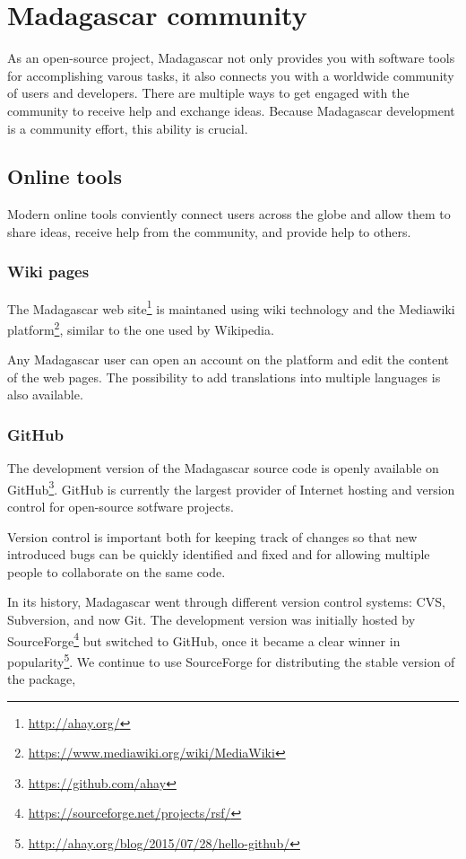\chapter{Madagascar community}

As an open-source project, Madagascar not only provides you with
software tools for accomplishing varous tasks, it also connects you
with a worldwide community of users and developers. There are multiple
ways to get engaged with the community to receive help and exchange
ideas. Because Madagascar development is a community effort, this
ability is crucial.

\section{Online tools}

Modern online tools conviently connect users across the globe and
allow them to share ideas, receive help from the community, and
provide help to others. 

\subsection{Wiki pages}

The Madagascar web site\footnote{\url{http://ahay.org/}} is maintaned
using wiki technology and the Mediawiki
platform\footnote{\url{https://www.mediawiki.org/wiki/MediaWiki}},
similar to the one used by Wikipedia. 

Any Madagascar user can open an account on the platform and edit the
content of the web pages. The possibility to add translations into
multiple languages is also available.

\subsection{GitHub}

The development version of the Madagascar source code is openly
available on GitHub\footnote{\url{https://github.com/ahay}}. GitHub is currently
the largest provider of Internet hosting and version control for
open-source sotfware projects.

Version control is important both for keeping track of changes so that
new introduced bugs can be quickly identified and fixed and for
allowing multiple people to collaborate on the same code.

In its history, Madagascar went through different version control
systems: CVS, Subversion, and now Git. The development version was
initially hosted by
SourceForge\footnote{\url{https://sourceforge.net/projects/rsf/}} but
switched to GitHub, once it became a clear winner in
popularity\footnote{\url{http://ahay.org/blog/2015/07/28/hello-github/}}. We
continue to use SourceForge for distributing the stable version of the
package,

